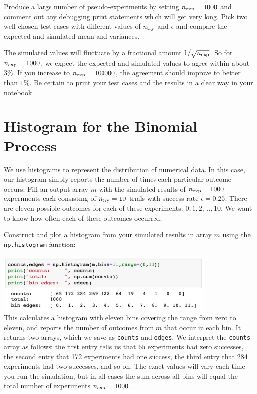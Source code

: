 \begin{print} Produce a large number of pseudo-experiments by setting $n_{\rm exp} =
1000$ and comment out any debugging print statements which will get
very long.  Pick two  well chosen test cases with different values of
$n_{\rm try}$ and $\epsilon$ and compare the expected and simulated
mean and variances. 


 The simulated values will fluctuate by a
fractional amount $1/\sqrt{n_{\rm exp}}$.  So for $n_{\rm exp} =
1000$, we expect the expected and simulated values to agree within
about $3\%$.  If you increase to $n_{\rm exp} = 100000$, the agreement
should improve to better than $1\%$.  Be certain to print your test
cases and the results in a clear way in your notebook. \end{print}

\section{Histogram for the Binomial Process}

We use histograms to represent the distribution of numerical data.  In
this case, our histogram simply reports the number of times each particular outcome
occurs.  Fill an output array $m$ with the simulated results of $n_{\rm exp} =
1000$ experiments each consisting of $n_{\rm try}=10$ trials with
success rate $\epsilon=0.25$.  There are eleven possible outcomes for
each of these experiments: $0,1,2,\ldots,10$.  We want to know how
often each of these outcomes occurred.

\begin{plot} Construct and plot a histogram from your simulated results in array $m$ using the 
{\tt np.histogram} function: \end{plot}
\includegraphics[width=0.8\textwidth]{figs/labs/distributions/makehist.png}\\ 
This calculates a histogram with eleven bins covering the range
from zero to eleven, and reports the number of outcomes from $m$ that
occur in each bin.  It returns two arrays, which we save as 
{\tt counts} and {\tt edges}.  We interpret the {\tt counts} array as
follows: the first entry tells us that 65 experiments had zero
successes, the second entry that 172 experiments had one success, the
third entry that 284 experiments had two successes, and so on.  The
exact values will vary each time you run the simulation, but in all
cases the sum across all bins will equal the total number of
experiments $n_{\rm exp} = 1000$.

